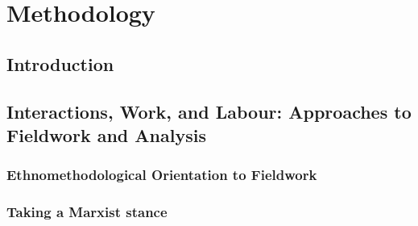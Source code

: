 \chapter{Methodology}
\label{sec:method}

\section{Introduction}
%
%
%
%


\section{Interactions, Work, and Labour: Approaches to Fieldwork and Analysis}
\label{sec:method:fieldwork}




\subsection{Ethnomethodological Orientation to Fieldwork}

\subsection{Taking a Marxist stance}


